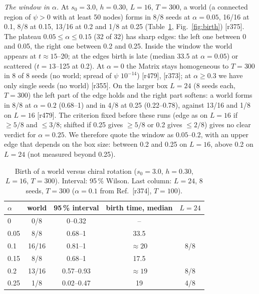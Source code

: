 \documentclass[reprint,pre,amsmath,amssymb,superscriptaddress,nofootinbib]{revtex4-2}
\newcommand{\sz}{s_0}
\begin{document}
\emph{The window in $\alpha$.} At $\sz=3.0$, $h=0.30$, $L=16$, $T=300$, a world (a connected region of $\psi>0$ with at least 50 nodes) forms in 8/8 seeds at $\alpha=0.05$, 16/16 at 0.1, 8/8 at 0.15, 13/16 at 0.2 and 1/8 at 0.25 (Table~\ref{tab:alpha}, Fig.~\ref{fig:birth}) [r375]. The plateau $0.05\le\alpha\le0.15$ (32 of 32) has sharp edges: the left one between 0 and 0.05, the right one between 0.2 and 0.25. Inside the window the world appears at $t\approx15$--20; at the edges birth is late (median 33.5 at $\alpha=0.05$) or scattered ($t=13$--125 at 0.2). At $\alpha=0$ the Matrix stays homogeneous to $T=300$ in 8 of 8 seeds (no world; spread of $\psi$ $10^{-14}$) [r479], [r373]; at $\alpha\ge0.3$ we have only single seeds (no world) [r355]. On the larger box $L=24$ (8 seeds each, $T=300$) the left part of the edge holds and the right part softens: a world forms in 8/8 at $\alpha=0.2$ (0.68--1) and in 4/8 at 0.25 (0.22--0.78), against 13/16 and 1/8 on $L=16$ [r479]. The criterion fixed before these runs (edge as on $L=16$ if $\ge5/8$ and $\le3/8$; shifted if 0.25 gives $\ge5/8$ or 0.2 gives $\le2/8$) gives no clear verdict for $\alpha=0.25$. We therefore quote the window as $0.05$--$0.2$, with an upper edge that depends on the box size: between 0.2 and 0.25 on $L=16$, above 0.2 on $L=24$ (not measured beyond 0.25).

\begin{table}[b]
\caption{Birth of a world versus chiral rotation ($\sz=3.0$, $h=0.30$, $L=16$, $T=300$). Interval: 95\,\% Wilson. Last column: $L=24$, 8 seeds, $T=300$ ($\alpha=0.1$ from Ref.~[r374], $T=100$).}\label{tab:alpha}
\begin{ruledtabular}
\begin{tabular}{lcccc}
$\alpha$ & world & 95\,\% interval & birth time, median & $L=24$ \\
\hline
0 & 0/8 & 0--0.32 & -- & \\
0.05 & 8/8 & 0.68--1 & 33.5 & \\
0.1 & 16/16 & 0.81--1 & $\approx20$ & 8/8 \\
0.15 & 8/8 & 0.68--1 & 17.5 & \\
0.2 & 13/16 & 0.57--0.93 & $\approx19$ & 8/8 \\
0.25 & 1/8 & 0.02--0.47 & 19 & 4/8 \\
\end{tabular}
\end{ruledtabular}
\end{table}
\end{document}
